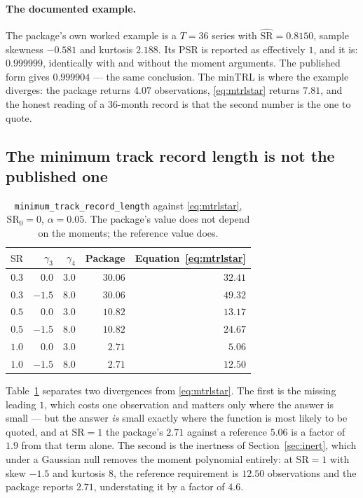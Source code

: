 \documentclass[11pt,a4paper]{article}
\newcommand{\code}[1]{\texttt{#1}}
\newcommand{\SR}{\mathrm{SR}}
\begin{document}
\paragraph{The documented example.}
The package's own worked example is a $T = 36$ series with
$\widehat{\SR} = 0.8150$, sample skewness $-0.581$ and kurtosis $2.188$. Its
PSR is reported as effectively $1$, and it is: $0.999999$, identically with and
without the moment arguments. The published form gives $0.999904$ --- the same
conclusion. The minTRL is where the example diverges: the package returns
$4.07$ observations, \eqref{eq:mtrlstar} returns $7.81$, and the honest reading
of a $36$-month record is that the second number is the one to quote.

\subsection{The minimum track record length is not the published one}

\begin{table}[t]
\centering
\caption{\code{minimum\_track\_record\_length} against
\eqref{eq:mtrlstar}, $\SR_0 = 0$, $\alpha = 0.05$. The package's value does
not depend on the moments; the reference value does.}
\label{tab:mtrl}
\begin{tabular}{rrrrr}
\toprule
$\SR$ & $\gamma_3$ & $\gamma_4$ & Package & Equation~\eqref{eq:mtrlstar} \\
\midrule
$0.3$ & $0.0$  & $3.0$ & $30.06$ & $32.41$ \\
$0.3$ & $-1.5$ & $8.0$ & $30.06$ & $49.32$ \\
$0.5$ & $0.0$  & $3.0$ & $10.82$ & $13.17$ \\
$0.5$ & $-1.5$ & $8.0$ & $10.82$ & $24.67$ \\
$1.0$ & $0.0$  & $3.0$ & $2.71$  & $5.06$  \\
$1.0$ & $-1.5$ & $8.0$ & $2.71$  & $12.50$ \\
\bottomrule
\end{tabular}
\end{table}

Table~\ref{tab:mtrl} separates two divergences from \eqref{eq:mtrlstar}. The
first is the missing leading $1$, which costs one observation and matters only
where the answer is small --- but the answer \emph{is} small exactly where the
function is most likely to be quoted, and at $\SR = 1$ the package's $2.71$
against a reference $5.06$ is a factor of $1.9$ from that term alone. The
second is the inertness of Section~\ref{sec:inert}, which under a Gaussian
null removes the moment polynomial entirely: at $\SR = 1$ with skew $-1.5$ and
kurtosis $8$, the reference requirement is $12.50$ observations and the
package reports $2.71$, understating it by a factor of $4.6$.
\end{document}
